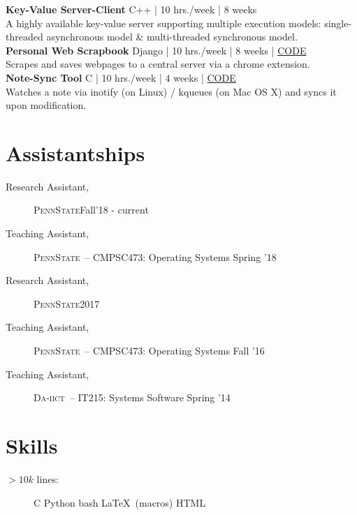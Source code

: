 \documentclass[margin]{res}
\newcommand{\daiict}{\textsc{Da-iict}}
\newcommand{\psu}{\textsc{PennState}}
\begin{document}
\begin{resume}
{\bfseries Key-Value Server-Client}\hfill
{\small C++ | 10 hrs./week | 8 weeks}\\
A highly available key-value server supporting multiple execution models:
single-threaded asynchronous model \& multi-threaded synchronous model.\\[2ex]

{\bfseries Personal Web Scrapbook}\hfill
{\small Django | 10 hrs./week | 8 weeks | \href{https://bitbucket.org/mitthu/capsule/src/}{CODE}}\\
Scrapes and saves webpages to a central server via a chrome extension.\\[2ex]

{\bfseries Note-Sync Tool}\hfill
{\small C | 10 hrs./week | 4 weeks | \href{https://github.com/mitthu/note-sync}{CODE}}\\
Watches a note via inotify (on Linux) / kqueues (on Mac OS X) and syncs it upon modification.

\section{Assistantships} 
\begin{description}
    \item[Research Assistant,] \psu \hfill Fall'18 - current
    \item[Teaching Assistant,] \psu\ -- CMPSC473: Operating Systems \hfill Spring '18 %
    \item[Research Assistant,] \psu \hfill 2017
    \item[Teaching Assistant,] \psu\ -- CMPSC473: Operating Systems \hfill Fall '16 %
    \item[Teaching Assistant,] \daiict\ -- IT215: Systems Software \hfill Spring '14 %
\end{description}

\section{Skills}
\begin{description}
    \item[$>10k$ lines:]
        C \textbullet{}
        Python \textbullet{}
        bash \textbullet{}
        \LaTeX\ (macros) \textbullet{}
        HTML


\end{description}
\end{resume}
\end{document}
